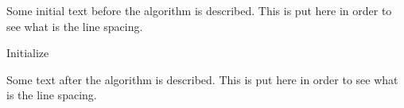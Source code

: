 \documentclass[a4paper,11pt]{article}
\begin{document}
Some initial text before the algorithm is described. This is put here 
in order to see what is the line spacing.


\makeatletter
\renewcommand{\algocf@linesnumbered}{\everypar={\rule{0pt}{.9\baselineskip}}}
\makeatother

\begin{algorithm}[h]
\dontprintsemicolon
Initialize\;
\end{algorithm}

Some text after the algorithm is described. This is put here in order 
to see what is the line spacing.
\end{document}
